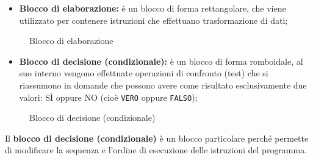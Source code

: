 \documentclass[
    notheorems,
    11pt,
    compress,
    aspectratio=169
]{beamer}
\begin{document}
\begin{frame}
    \begin{itemize}
        \item \textbf{Blocco di elaborazione:} è un blocco di forma rettangolare, che viene utilizzato per contenere istruzioni che effettuano trasformazione di dati;
    \end{itemize}

    \begin{figure}[htbp]
        \centering
        
        
        \caption{Blocco di elaborazione}
        \label{fig:14}
    \end{figure}

    \newpage

    \begin{itemize}
        \item \textbf{Blocco di decisione (condizionale):} è un blocco di forma romboidale, al suo interno vengono effettuate operazioni di confronto (te\textit{}st) che si riassumono in domande che possono avere come risultato esclusivamente due valori: SÌ oppure NO (cioè \verb|VERO| oppure \verb|FALSO|);
    \end{itemize}

    \begin{figure}[htbp]
        \centering
        
        
        \caption{Blocco di decisione (condizionale)}
        \label{fig:15}
    \end{figure}

    Il \textbf{blocco di decisione (condizionale)} è un blocco particolare perché permette di modificare la sequenza e l'ordine di esecuzione delle istruzioni del programma.

    \begin{figure}[htbp]
        \centering

\end{figure}
\end{frame}
\end{document}
